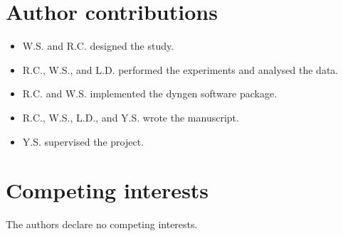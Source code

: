 \documentclass[10pt, a4paper]{article}
\begin{document}
\hypertarget{author-contributions}{%
	\section{Author contributions}\label{author-contributions}}

\begin{itemize}
	\item
	W.S. and R.C. designed the study.
	\item
	R.C., W.S., and L.D. performed the experiments and analysed the data.
	\item
	R.C. and W.S. implemented the dyngen software package.
	\item
	R.C., W.S., L.D., and Y.S. wrote the manuscript.
	\item
	Y.S. supervised the project.
\end{itemize}

\hypertarget{competing-interests}{%
	\section{Competing interests}\label{competing-interests}}

The authors declare no competing interests.

%
%
\end{document}
